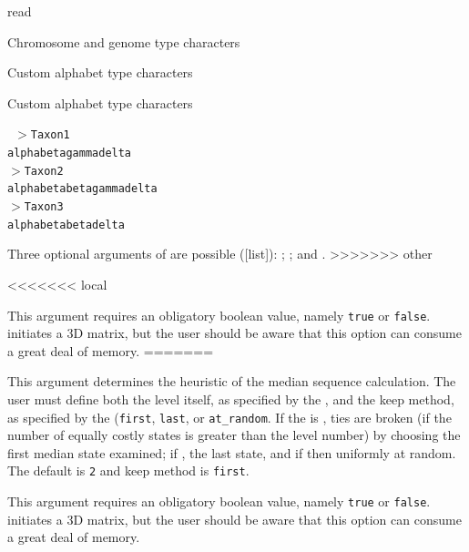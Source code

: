 \begin{command}{read}{}
\begin{arguments}
\begin{argumentgroup}{Chromosome and genome type characters}
\begin{argumentgroup}{Custom alphabet type characters}
\begin{argumentgroup}{Custom alphabet type characters}
{{                \texttt{
                    $>$Taxon1\\
                    alphabetagammadelta\\
                    $>$Taxon2\\
                    alphabetabetagammadelta\\
                    $>$Taxon3\\
                    alphabetabetadelta}
    
                Three optional arguments of  are
                possible ([\poylident list]): ;
                ; and .
>>>>>>> other

<<<<<<< local
	\begin{description}
	
	 {\obligatory \poybool}
	{This argument requires an obligatory boolean value, namely \texttt{true} or \texttt{false}.
	  initiates a 3D matrix, but the user should be aware 
	that this option can consume a great deal of memory.}
	{}
=======
                \begin{description}
                        {This argument determines the heuristic  of the median sequence calculation.  
                        The user must define both the level itself, as specified by the \poyint, and the keep method, as specified 
                        by the \poylident (\texttt{first}, \texttt{last}, or \texttt{at\_random}.  If the \poylident is , 
                        ties are broken (if the number of equally costly states is greater than the level number) by choosing the 
                        first median state examined; if , the last state, and if 
                         then uniformly at random. The default      is \texttt{2} and keep method is \texttt{first}.  }
                        {}
                        
                     {\obligatory \poybool}
                        {This argument requires an obligatory boolean value, namely \texttt{true} or \texttt{false}.
                          initiates a 3D matrix, but the user should be aware 
                        that this option can consume a great deal of memory.}
                        {}
                        

\end{description}
\end{description}}}
\end{argumentgroup}
\end{argumentgroup}
\end{argumentgroup}
\end{arguments}
\end{command}
